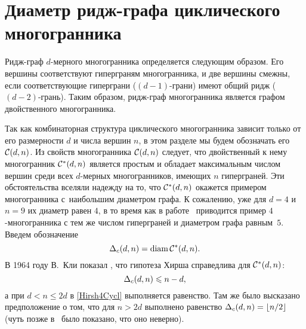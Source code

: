 \section{Диаметр ридж-графа циклического многогранника}
\label{sec:RidgeGraph}

Ридж-граф $d$-мерного многогранника определяется следующим образом. %
Его вершины соответствуют гиперграням многогранника, и две вершины смежны, если соответствующие гиперграни ($(d-1)$-грани) имеют общий ридж ($(d-2)$-грань).
Таким образом, ридж-граф многогранника является графом двойственного многогранника.

Так как комбинаторная структура циклического многогранника зависит только от его размерности $d$ и числа вершин $n$, в этом разделе мы будем обозначать его ${\mathcal C}(d,n)$.
Из свойств многогранника ${\mathcal C}(d,n)$ следует, что двойственный к нему многогранник ${\mathcal C}^*(d,n)$ является простым и обладает максимальным числом вершин среди всех $d$-мерных многогранников, имеющих $n$ гиперграней.
Эти обстоятельства вселяли надежду на то, что %
${\mathcal C}^*(d,n)$ окажется примером многогранника с~наибольшим диаметром графа. 
К сожалению, уже для $d=4$ и $n=9$ их диаметр равен $4$,
в то время как в работе~\cite{Klee:1967} приводится 
пример $4$-многогранника с тем же числом гиперграней и диаметром графа равным~$5$.
Введем обозначение
\[
{\Delta_{c}(d,n)}=\operatorname{diam} {\mathcal C}^*(d,n).
\]
В 1964 году В.~Кли показал \cite{Klee:1964}, что гипотеза Хирша справедлива для ${\mathcal C}^*(d,n)$: 
\begin{equation}
\label{Hirsh4Cycl}
{\Delta_{c}(d,n)}\leqslant n-d,
\end{equation}
а при $d < n\le 2d$ в \eqref{Hirsh4Cycl} выполняется равенство.
Там же было высказано предположение о том, что для $n>2d$ выполнено 
равенство ${\Delta_{c}(d,n)}=\left\lfloor n/2\right\rfloor$ 
(чуть позже в~\cite{Klee:1967} было показано, что оно неверно).

